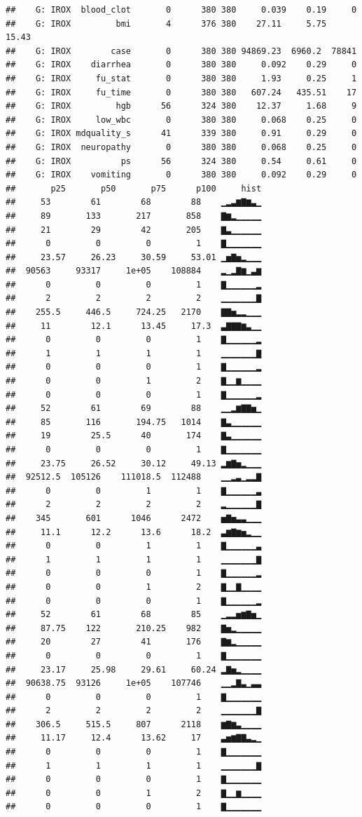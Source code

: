 \documentclass[fleqn,10pt,lineno]{wlpeerj} %
\begin{document}
\begin{verbatim}
##    G: IROX  blood_clot       0      380 380     0.039    0.19     0   
##    G: IROX         bmi       4      376 380    27.11     5.75    15.43
##    G: IROX        case       0      380 380 94869.23  6960.2  78841   
##    G: IROX    diarrhea       0      380 380     0.092    0.29     0   
##    G: IROX     fu_stat       0      380 380     1.93     0.25     1   
##    G: IROX     fu_time       0      380 380   607.24   435.51    17   
##    G: IROX         hgb      56      324 380    12.37     1.68     9   
##    G: IROX     low_wbc       0      380 380     0.068    0.25     0   
##    G: IROX mdquality_s      41      339 380     0.91     0.29     0   
##    G: IROX  neuropathy       0      380 380     0.068    0.25     0   
##    G: IROX          ps      56      324 380     0.54     0.61     0   
##    G: IROX    vomiting       0      380 380     0.092    0.29     0   
##       p25       p50       p75      p100     hist
##     53        61        68        88    ▁▂▃▆▇▆▃▁
##     89       133       217       858    ▇▆▂▁▁▁▁▁
##     21        29        42       205    ▇▃▁▁▁▁▁▁
##      0         0         0         1    ▇▁▁▁▁▁▁▁
##     23.57     26.23     30.59     53.01 ▁▅▇▅▂▁▁▁
##  90563     93317     1e+05    108884    ▂▁▂▇▆▁▃▆
##      0         0         0         1    ▇▁▁▁▁▁▁▂
##      2         2         2         2    ▁▁▁▁▁▁▁▇
##    255.5     446.5     724.25   2170    ▇▇▅▂▂▁▁▁
##     11        12.1      13.45     17.3  ▃▇▇▇▆▃▁▁
##      0         0         0         1    ▇▁▁▁▁▁▁▂
##      1         1         1         1    ▁▁▁▁▁▁▁▇
##      0         0         0         1    ▇▁▁▁▁▁▁▂
##      0         0         1         2    ▇▁▁▆▁▁▁▁
##      0         0         0         1    ▇▁▁▁▁▁▁▂
##     52        61        69        88    ▁▁▂▆▇▇▅▁
##     85       116       194.75   1014    ▇▃▁▁▁▁▁▁
##     19        25.5      40       174    ▇▃▁▁▁▁▁▁
##      0         0         0         1    ▇▁▁▁▁▁▁▁
##     23.75     26.52     30.12     49.13 ▂▆▇▅▂▁▁▁
##  92512.5  105126    111018.5  112488    ▁▁▂▃▁▂▂▇
##      0         0         1         1    ▇▁▁▁▁▁▁▃
##      2         2         2         2    ▂▁▁▁▁▁▁▇
##    345       601      1046      2472    ▅▇▅▃▃▁▁▁
##     11.1      12.2      13.6      18.2  ▃▆▇▆▅▂▁▁
##      0         0         1         1    ▇▁▁▁▁▁▁▃
##      1         1         1         1    ▁▁▁▁▁▁▁▇
##      0         0         0         1    ▇▁▁▁▁▁▁▂
##      0         0         1         2    ▇▁▁▇▁▁▁▁
##      0         0         0         1    ▇▁▁▁▁▁▁▂
##     52        61        68        85    ▁▂▂▅▆▇▅▁
##     87.75    122       210.25    982    ▇▅▂▁▁▁▁▁
##     20        27        41       176    ▇▆▂▁▁▁▁▁
##      0         0         0         1    ▇▁▁▁▁▁▁▁
##     23.17     25.98     29.61     60.24 ▂▇▅▂▁▁▁▁
##  90638.75  93126     1e+05    107746    ▁▁▂▇▃▁▃▃
##      0         0         0         1    ▇▁▁▁▁▁▁▁
##      2         2         2         2    ▁▁▁▁▁▁▁▇
##    306.5     515.5     807      2118    ▆▇▆▃▁▁▁▁
##     11.17     12.4      13.62     17    ▃▅▆▇▇▃▂▁
##      0         0         0         1    ▇▁▁▁▁▁▁▁
##      1         1         1         1    ▁▁▁▁▁▁▁▇
##      0         0         0         1    ▇▁▁▁▁▁▁▁
##      0         0         1         2    ▇▁▁▆▁▁▁▁
##      0         0         0         1    ▇▁▁▁▁▁▁▁
\end{verbatim}
\end{document}

